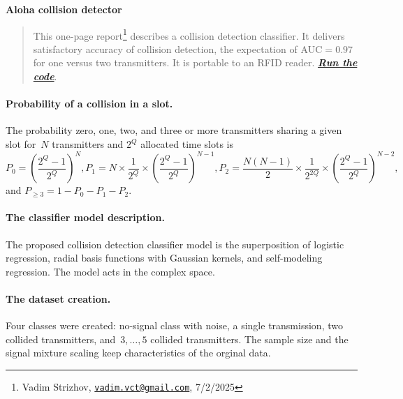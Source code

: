 \documentclass[12pt]{article}
\newcommand{\D}{{2^Q}}
\begin{document}
\begin{center}
{\Huge\bf Aloha collision detector}
\end{center}


\begin{quote}
This one-page report\footnote{Vadim Strizhov, \href{mailto:vadim.vct@gmail.com}{\texttt{vadim.vct@gmail.com}}, 7/2/2025} describes a collision detection classifier. It delivers satisfactory accuracy of collision detection, the expectation of $\text{AUC} = 0.97$ for one versus two transmitters. It is portable to an RFID reader. {\bf \emph{\hyperref[sec:experiment]{Run the code}}}.
\end{quote}


\paragraph{Probability of a collision in a slot.} The probability zero, one, two, and three or more transmitters sharing a given slot for~$N$ transmitters and $2^Q$ allocated time slots is 
\[
P_0 = \left( \frac{\D-1}{\D} \right)^N, 
P_1 = N \times \frac{1}{\D} \times \left(\frac{\D-1}{\D}\right)^{N-1},
P_2 = \frac{N(N-1)}{2}  \times \frac{1}{2^{2Q}} \times \left(\frac{\D-1}{\D}\right)^{N-2},
\]
and $P_{\geq 3} = 1 - P_0 - P_1 - P_2$. 

\paragraph{The classifier model description.} The proposed collision detection classifier model is the superposition of logistic regression, radial basis functions with Gaussian kernels, and self-modeling regression. %
The model acts in the complex space.

\paragraph{The dataset creation.} Four classes were created: no-signal class with noise, a single transmission,  two collided transmitters, and~$3,\ldots,5$ collided transmitters. The sample size and the signal mixture scaling keep characteristics of the orginal data. %
\end{document}
